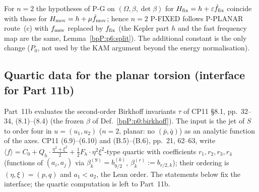 \begin{remark}\label{bpP:p8:use11}
For $n=2$ the hypotheses of P-G on $(\Omega,\beta,\det\beta)$ for $H_{\rm fix}=h+\varepsilon\hat f_{\rm fix}$ coincide with those for $H_{\rm mov}=h+\mu\hat f_{\rm mov}$; hence $n=2$ P-FIXED follows P-PLANAR route~(c) with $f_{\rm mov}$ replaced by $f_{\rm fix}$ (the Kepler part $h$ and the fast frequency map are the same, Lemma~\ref{bpP:p6:split}). The additional constant is the only change ($P_0$, not used by the KAM argument beyond the energy normalisation).
\end{remark}

\subsection{Quartic data for the planar torsion (interface for Part 11b)}\label{bpP:p8:sec-quartic}

Part~11b evaluates the second-order Birkhoff invariants $\tau$ of CP11 \S8.1, pp.~32--34, (8.1)--(8.4) (the frozen $\beta$ of Def.~\ref{bpP:p0:birkhoff}). The input is the jet of $S$ to order four in $u=(u_1,u_2)$ ($n=2$, planar: no $(\bar p,\bar q)$) as an analytic function of the axes. CP11 (6.9)--(6.10) and (B.5)--(B.6), pp.~21, 62--63, write $\langle f\rangle=C_0+Q_h\cdot\frac{\eta^2+\xi^2}2+\frac12F_h\cdot\eta^2\xi^2$-type quartic with coefficients $r_1,r_2,r_3,r_4$ (functions of $(a_i,a_j)$ via $\beta^{(9)}_k=b_{9/2}^{(k)}$, $\beta_k^{(r)}:=b_{r/2,k}$); their ordering is $(\eta,\xi)=(p,q)$ and $a_1<a_2$, the Lean order. The statements below fix the interface; the quartic computation is left to Part~11b.

